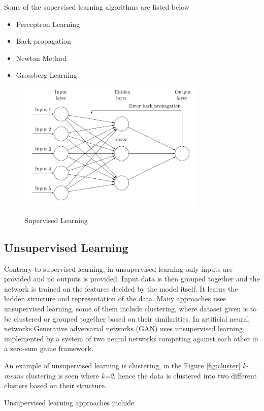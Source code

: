 \documentclass[12pt, a4paper]{report}
\begin{document}
Some of the supervised learning algorithms are listed below
\begin{itemize}
	\item{Perceptron Learning}
	\item{Back-propagation}
	\item{Newton Method}
	\item{Grossberg Learning}
\end{itemize}

\begin{figure}[h]
\centering	
\includegraphics[width=9cm]{supervised.png}\\
\caption{Supervised Learning}
\label{fig:supervised}
\end{figure} 


\subsection{Unsupervised Learning}\label{sec:unsupervised}

Contrary to supervised learning, in unsupervised learning only inputs are provided and no outputs is provided. Input data is then grouped together and the network is trained on the features decided by the model itself. It learns the hidden structure and representation of the data. 
Many approaches uses unsupervised learning, some of them include clustering, where dataset given is to be clustered or grouped together based on their similarities. In artificial neural networks Generative adversarial networks (GAN) uses unsupervised learning, implemented by a system of two neural networks competing against each other in a zero-sum game framework\cite{unsupervised}.\\ \par
An example of unsupervised learning is clustering, in the Figure \ref{fig:cluster} \textit{k-means} clustering is seen where \textit{k=2}, hence the data is clustered into two different clusters based on their structure.\\ \par
Unsupervised learning approaches include
\end{document}
